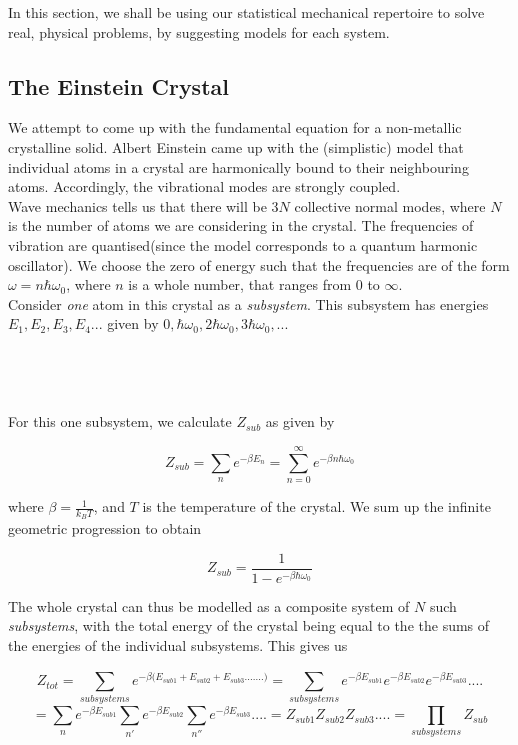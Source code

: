 \documentclass[oneside]{book}
\begin{document}
In this section, we shall be using our statistical mechanical repertoire to solve real, physical problems, by suggesting models for each system. 

\subsection{The Einstein Crystal}
We attempt to come up with the fundamental equation for a non-metallic crystalline solid. Albert Einstein came up with the (simplistic) model that individual atoms in a crystal are harmonically bound to their neighbouring atoms. Accordingly, the vibrational modes are strongly coupled. \\

Wave mechanics tells us that there will be $3N$ collective normal modes, where $N$ is the number of atoms we are considering in the crystal. The frequencies of vibration are quantised(since the model corresponds to a quantum harmonic oscillator). We choose the zero of energy such that the frequencies are of the form $\omega = n\hbar\omega_0$, where $n$ is a whole number, that ranges from 0 to $ \infty $.\\

Consider \emph{one} atom in this crystal as a \emph{subsystem}. This subsystem has energies $E_1, E_2, E_3, E_4...$ given by $0, \hbar\omega_0, 2\hbar\omega_0, 3\hbar\omega_0,...$\\ \\ \\ \\ \\

For this one subsystem, we calculate $Z_{sub}$ as given by

\[ Z_{sub} = \sum_{n}^{}e^{-\beta E_n} =  \sum_{n = 0}^{\infty}e^{-\beta n\hbar\omega_0} \] 

where $\beta = \frac{1}{k_BT} $, and $T$ is the temperature of the crystal. We sum up the infinite geometric progression to obtain 

\[ Z_{sub} = \frac{1}{1 - e^{-\beta\hbar\omega_0}}\]

The whole crystal can thus be modelled as a composite system of $N$ such \emph{subsystems}, with the total energy of the crystal being equal to the the sums of the energies of the individual subsystems. This gives us

\[Z_{tot} = \sum_{subsystems}^{}e^{-\beta({E_{sub1} + E_{sub2}+ E_{sub3}.......) }} 
= \sum_{subsystems}^{}e^{-\beta E_{sub1}}e^{-\beta E_{sub2}}e^{-\beta E_{sub3}}....\]
\[= \sum_{n}^{}e^{-\beta E_{sub1}} \sum_{n'}^{}e^{-\beta E_{sub2}} \sum_{n''}^{}e^{-\beta E_{sub3}}....
= Z_{sub1}Z_{sub2}Z_{sub3}.... = \prod_{subsystems}^{}Z_{sub}\]
\end{document}
